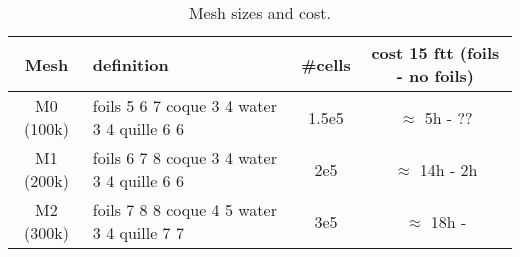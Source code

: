     \begin{table}[ht!]
        \centering\begin{tabular}{c|p{4cm}|c|c}
            Mesh & definition & \#cells & cost 15 ftt (foils - no foils)\\
            \hline
            \hline
            M0 (100k) & foils 5 6 7 \newline coque 3 4 \newline water 3 4 \newline quille 6 6 & 1.5e5 & $\approx$ 5h - ??\\
            M1 (200k)& foils 6 7 8 \newline coque 3 4 \newline water 3 4 \newline quille 6 6 & 2e5 & $\approx$ 14h - 2h \\
            M2 (300k)& foils 7 8 8 \newline coque 4 5 \newline water 3 4 \newline quille 7 7 & 3e5 & $\approx$ 18h - \\
        \end{tabular}
        \caption{Mesh sizes and cost.}
        \label{tab:meshes}
    \end{table}





